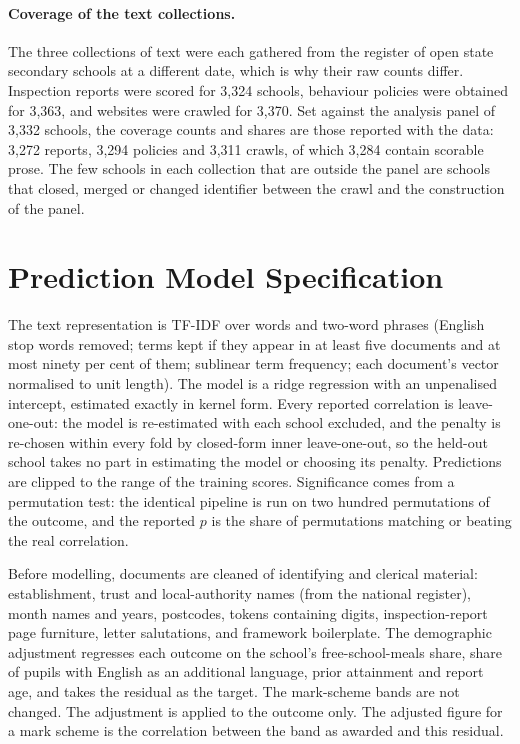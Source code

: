 \paragraph{Coverage of the text collections.} The three collections of
text were each gathered from the register of open state secondary schools at
a different date, which is why their raw counts differ. Inspection reports
were scored for 3,324 schools, behaviour policies were obtained for 3,363,
and websites were crawled for 3,370. Set against the analysis panel of 3,332 schools, the coverage counts and shares are those reported with the data: 3,272 reports, 3,294 policies and 3,311 crawls, of which 3,284 contain scorable prose. The few schools in each collection that
are outside the panel are schools that closed, merged or changed identifier
between the crawl and the construction of the panel.

\clearpage
\section{Prediction Model Specification}
\label{sec:p1_app_prediction}

The text representation is TF-IDF over words and two-word phrases
(English stop words removed; terms kept if they appear in at least five
documents and at most ninety per cent of them; sublinear term frequency;
each document's vector normalised to unit length). The model is a ridge
regression with an unpenalised intercept, estimated exactly in kernel
form. Every reported correlation is leave-one-out: the model is re-estimated with each school excluded, and the penalty is re-chosen within every fold
by closed-form inner leave-one-out, so the held-out school takes no part in estimating the model or choosing its penalty. Predictions are clipped to the range of the
training scores. Significance comes from a permutation test: the identical
pipeline is run on two hundred permutations of the outcome, and the
reported $p$ is the share of permutations matching or beating the real
correlation.

Before modelling, documents are cleaned of identifying and clerical
material: establishment, trust and local-authority names (from the
national register), month names and years, postcodes, tokens containing
digits, inspection-report page furniture, letter salutations, and
framework boilerplate. The demographic adjustment regresses each outcome on the school's free-school-meals share, share of pupils with English as an additional language, prior attainment and report age, and takes the residual as the target. The mark-scheme bands are not changed. The adjustment is applied to the outcome only. The adjusted figure for a mark scheme is the correlation between the band as awarded and this residual.

